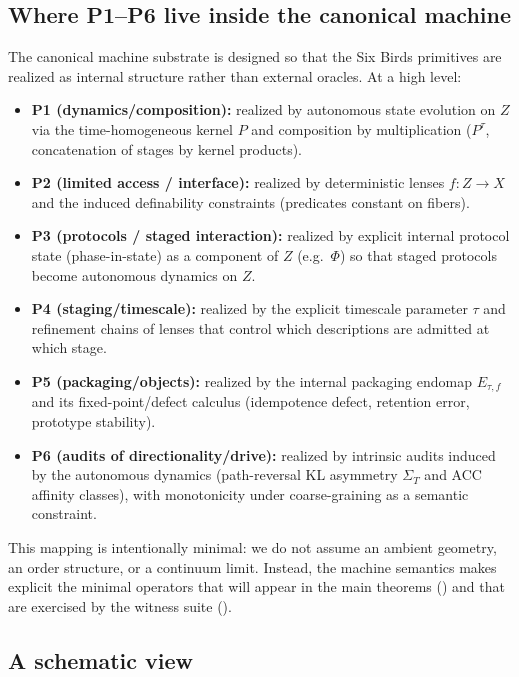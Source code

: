 \documentclass[11pt]{article}
\theoremstyle{definition}
\theoremstyle{remark}
\begin{document}
\subsection{Where P1--P6 live inside the canonical machine}

The canonical machine substrate is designed so that the Six Birds primitives are realized as internal structure rather than external oracles.
At a high level:

\begin{itemize}[leftmargin=*, itemsep=0.25em]
  \item \textbf{P1 (dynamics/composition):} realized by autonomous state evolution on $Z$ via the time-homogeneous kernel $P$ and composition by multiplication ($P^\tau$, concatenation of stages by kernel products).
  \item \textbf{P2 (limited access / interface):} realized by deterministic lenses $f:Z\to X$ and the induced definability constraints (predicates constant on fibers).
  \item \textbf{P3 (protocols / staged interaction):} realized by explicit internal protocol state (phase-in-state) as a component of $Z$ (e.g.\ $\Phi$) so that staged protocols become autonomous dynamics on $Z$.
  \item \textbf{P4 (staging/timescale):} realized by the explicit timescale parameter $\tau$ and refinement chains of lenses that control which descriptions are admitted at which stage.
  \item \textbf{P5 (packaging/objects):} realized by the internal packaging endomap $E_{\tau,f}$ and its fixed-point/defect calculus (idempotence defect, retention error, prototype stability).
  \item \textbf{P6 (audits of directionality/drive):} realized by intrinsic audits induced by the autonomous dynamics (path-reversal KL asymmetry $\Sigma_T$ and ACC affinity classes), with monotonicity under coarse-graining as a semantic constraint.
\end{itemize}

This mapping is intentionally minimal: we do not assume an ambient geometry, an order structure, or a continuum limit.
Instead, the machine semantics makes explicit the minimal operators that will appear in the main theorems () and that are exercised by the witness suite ().

\subsection{A schematic view}
\end{document}
